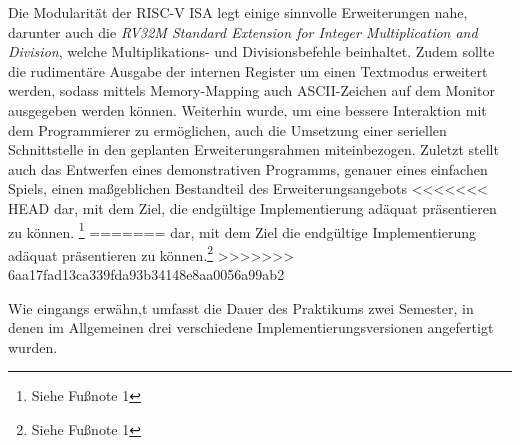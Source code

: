Die Modularit\"at der RISC-V ISA legt einige sinnvolle Erweiterungen nahe,
darunter auch die
\textit{RV32M Standard Extension for Integer Multiplication and Division},
welche Multiplikations- und Divisionsbefehle beinhaltet. Zudem sollte die
rudiment\"are Ausgabe der internen Register um einen Textmodus erweitert
werden, sodass mittels Memory-Mapping auch ASCII-Zeichen auf dem Monitor
ausgegeben werden k\"onnen. Weiterhin wurde, um eine bessere Interaktion mit
dem Programmierer zu erm\"oglichen, auch die Umsetzung einer seriellen
Schnittstelle in den geplanten Erweiterungsrahmen miteinbezogen. Zuletzt
stellt auch das Entwerfen eines demonstrativen Programms, genauer eines
einfachen Spiels, einen ma\ss{}geblichen Bestandteil des Erweiterungsangebots
<<<<<<< HEAD
dar, mit dem Ziel, die endg\"ultige Implementierung ad\"aquat pr\"asentieren zu k\"onnen.
\footnote{Siehe Fu\ss{}note 1}
=======
dar, mit dem Ziel die endg\"ultige Implementierung ad\"aquat pr\"asentieren zu k\"onnen.\footnote{Siehe Fu\ss{}note 1}
>>>>>>> 6aa17fad13ca339fda93b34148e8aa0056a99ab2

Wie eingangs erw\"ahn,t umfasst die Dauer des Praktikums zwei Semester, in
denen im Allgemeinen drei verschiedene Implementierungsversionen angefertigt
wurden.

